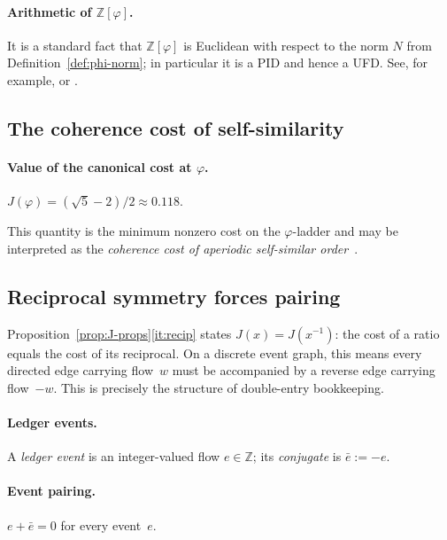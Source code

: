 \documentclass[11pt,reqno]{amsart}
\theoremstyle{plain}
\theoremstyle{definition}
\theoremstyle{remark}
\newcommand{\phig}{\varphi}
\newcommand{\Jcost}{J}
\newcommand{\ZZ}{\mathbb{Z}}
\newcommand{\1}{\mathbf{1}}
\begin{document}
\paragraph{Arithmetic of $\ZZ[\phig]$.} It is a standard fact that $\ZZ[\phig]$ is Euclidean with respect to the norm $N$ from Definition~\ref{def:phi-norm}; in particular it is a PID and hence a UFD. See, for example, \cite[Ch.~10]{ireland_rosen} or \cite[\S~I.5]{marcus1977}.

\subsection{The coherence cost of self-similarity}\label{ssec:Jphi} \paragraph{Value of the canonical cost at $\phig$.}\label{prop:Jphi}
$\Jcost(\phig)=(\sqrt5-2)/2\approx0.118$.

This quantity is the minimum nonzero cost on the $\phig$-ladder
and may be interpreted as the \emph{coherence cost of aperiodic
self-similar order}~. %

\label{sec:ledger}
\subsection{Reciprocal symmetry forces pairing} Proposition~\ref{prop:J-props}\ref{it:recip} states
$\Jcost(x)=\Jcost(x^{-1})$: the cost of a ratio equals the cost of its
reciprocal. On a discrete event graph, this means every directed edge
carrying flow~$w$ must be accompanied by a reverse edge carrying
flow~$-w$. This is precisely the structure of double-entry
bookkeeping. \paragraph{Ledger events.}\label{def:event}
A \emph{ledger event} is an integer-valued flow $e\in\ZZ$; its \emph{conjugate} is $\bar e:=-e$.
 

\paragraph{Event pairing.}\label{prop:pairing}
$e+\bar e=0$ for every event~$e$.
\end{document}
